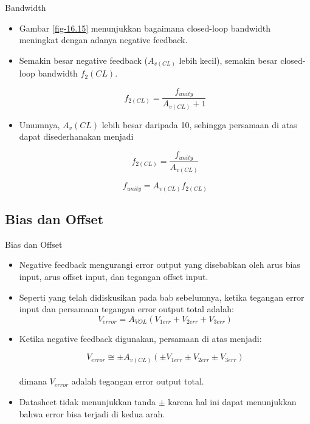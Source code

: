 \begin{frame}[t]{Bandwidth}
	\begin{itemize}
		\item Gambar \ref{fig-16.15} menunjukkan bagaimana closed-loop bandwidth meningkat dengan adanya negative feedback.
		\item Semakin besar negative feedback ($ A_{v(CL)} $ lebih kecil), semakin besar closed-loop bandwidth $ f_2(CL) $.

		\begin{equation*}
			f_{2(CL)} = \frac{f_{unity}}{A_{v(CL)} + 1}
		\end{equation*}
		
		\item Umumnya, $ A_v(CL) $ lebih besar daripada 10, sehingga persamaan di atas dapat disederhanakan menjadi
		
		\begin{equation}\label{pers.16.05}
			f_{2(CL)} = \frac{f_{unity}}{A_{v(CL)}}
		\end{equation}
	
		\begin{equation}\label{pers.16.06}
			f_{unity} = A_{v(CL)}f_{2(CL)}
		\end{equation}
	\end{itemize}
\end{frame}

\subsection{Bias dan Offset}

\begin{frame}[t]{Bias dan Offset}
	\begin{itemize}
		\item Negative feedback mengurangi error output yang disebabkan oleh arus bias input, arus offset input, dan tegangan offset input.
		\item Seperti yang telah didiskusikan pada bab sebelumnya, ketika tegangan error input dan persamaan tegangan error output total adalah:\\

		\[ V_{error} = A_{VOL} (V_{1err} + V_{2err} + V_{3err}) \]

		\item Ketika negative feedback digunakan, persamaan di atas menjadi:

		\begin{equation}\label{pers.16.07}
			V_{error} \cong \pm A_{v(CL)} ( \pm V_{1err} \pm V_{2err} \pm V_{3err} )
		\end{equation}
		\\
		dimana $ V_{error} $ adalah tegangan error output total.
		\item Datasheet tidak menunjukkan tanda $ \pm $ karena hal ini dapat menunjukkan bahwa error bisa terjadi di kedua arah.
	\end{itemize}
\end{frame}


